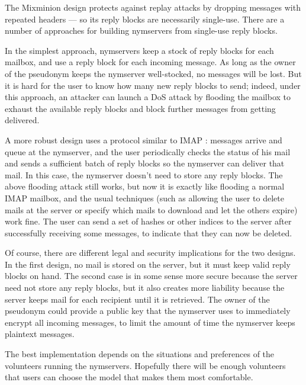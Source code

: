 \documentclass{llncs}
\begin{document}
The Mixminion design protects against replay attacks by dropping
messages with repeated headers --- so its reply blocks are necessarily
single-use. There are a number of approaches for building nymservers
from single-use reply blocks.

In the simplest approach, nymservers keep a stock of reply blocks for
each mailbox, and use a reply block for each incoming message. As long
as the owner of the pseudonym keeps the nymserver well-stocked, no
messages will be lost.  But it is hard for the user to know how many
new reply blocks to send; indeed, under this approach, an attacker can
launch a DoS attack by flooding the mailbox to exhaust the available
reply blocks and block further messages from getting delivered.

A more robust design uses a protocol similar to IMAP \cite{IMAP}:
messages arrive and queue at the nymserver, and the user periodically
checks the status of his mail and sends a sufficient batch of reply
blocks so the nymserver can deliver that mail. 
In this case, the nymserver doesn't need to store any reply blocks.
The above flooding attack still works, but now it is exactly
like flooding a normal IMAP mailbox, and the usual techniques (such as
allowing the user to delete mails at the server or specify which mails to
download and let the others expire) work fine. The user can send a set
of hashes or other indices to the server after successfully receiving
some messages, to indicate that they can now be deleted.

Of course, there are different legal and security implications for the two
designs. In the first design, no mail is stored on the server, but it must
keep valid reply blocks on hand. The second case is in some sense more
secure because the server need not store any reply blocks, but it also
creates more liability because the server keeps mail for each recipient
until it is retrieved. The owner of the pseudonym could provide a public
key that the nymserver uses to immediately encrypt all incoming messages,
to limit the amount of time the nymserver keeps plaintext messages.

The best implementation depends on the situations and preferences of
the volunteers running the nymservers. Hopefully there will be enough
volunteers that users can choose the model that makes them most
comfortable.
\end{document}
